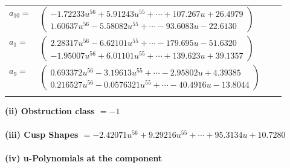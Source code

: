 \documentclass[1p]{elsarticle_modified}
\theoremstyle{definition}
\begin{document}
\begin{tabular}{m{7pt} m{180pt} m{7pt} m{180pt} }
\flushright $a_{10}=$&$\begin{pmatrix}-1.72233 u^{56}+5.91243 u^{55}+\cdots+107.267 u+26.4979\\1.60637 u^{56}-5.58082 u^{55}+\cdots-93.6083 u-22.6130\end{pmatrix}$ \\
\flushright $a_{1}=$&$\begin{pmatrix}2.28317 u^{56}-6.62101 u^{55}+\cdots-179.695 u-51.6320\\-1.95007 u^{56}+6.01101 u^{55}+\cdots+139.623 u+39.1357\end{pmatrix}$ \\
\flushright $a_{9}=$&$\begin{pmatrix}0.693372 u^{56}-3.19613 u^{55}+\cdots-2.95802 u+4.39385\\0.216527 u^{56}-0.0576321 u^{55}+\cdots-40.4916 u-13.8044\end{pmatrix}$\\&\end{tabular}
\flushleft \textbf{(ii) Obstruction class $= -1$}\\~\\
\flushleft \textbf{(iii) Cusp Shapes $= -2.42071 u^{56}+9.29216 u^{55}+\cdots+95.3134 u+10.7280$}\\~\\
\newpage\renewcommand{\arraystretch}{1}
\flushleft \textbf{(iv) u-Polynomials at the component}\newline \\
\end{document}
